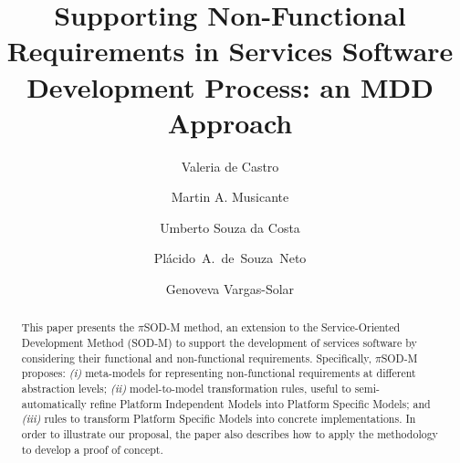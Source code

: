 \documentclass{llncs}
\theoremstyle{plain}
\theoremstyle{plain}
\theoremstyle{plain}
\begin{document}
%

 
\title{Supporting Non-Functional Requirements in Services Software Development Process: an MDD Approach}

\author{Valeria de Castro \and Martin A. Musicante \and Umberto Souza da Costa \and Pl\'acido~A.~de~Souza~Neto \and Genoveva Vargas-Solar}



 
\maketitle
\begin{abstract}
This paper presents the $\pi$SOD-M method, an extension to the Service-Oriented Development Method (SOD-M) to support the development of services software by considering their functional and    non-functional requirements. 
Specifically, $\pi$SOD-M proposes: 
\textit{(i)} meta-models for representing non-functional requirements at different abstraction levels; 
\textit{(ii)} model-to-model transformation rules, useful to semi-automatically refine Platform Independent Models into Platform Specific Models; and 
\textit{(iii)} rules to transform Platform Specific Models into concrete implementations. 
In order to illustrate our proposal, the paper also describes how to apply the methodology to develop a proof of concept.
\end{abstract}


\end{document}
